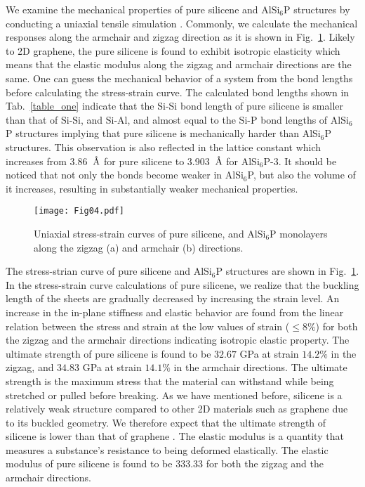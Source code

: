 \documentclass[5p,twocolumn]{elsarticle}
\newcommand{\angstrom}{\text{\normalfont\AA}}
\def\fig#1{Fig.\ \ref{#1}}
\def\tab#1{Tab.\ \ref{#1}}
\begin{document}
We examine the mechanical properties of pure silicene and AlSi$_6$P structures by conducting a uniaxial tensile simulation \cite{MORTAZAVI2017228}. Commonly, we calculate the mechanical responses along the armchair and zigzag direction as it is shown in \fig{fig04}. Likely to 2D graphene, the pure silicene is found to exhibit isotropic elasticity which means that the elastic modulus along the zigzag and armchair directions are the same. One can guess the mechanical behavior of a system from the bond lengths before calculating the stress-strain curve. The calculated bond lengths shown in \tab{table_one} indicate that the Si-Si bond length of pure silicene is smaller than that of Si-Si, and Si-Al, and almost equal to the Si-P bond lengths of AlSi$_6$P structures implying that pure silicene is mechanically harder than AlSi$_6$P structures. This observation is also reflected in the lattice constant which increases from 3.86~$\angstrom$ for pure silicene to 3.903~$\angstrom$ for AlSi$_6$P-3.       
It should be noticed that not only the bonds become weaker in AlSi$_6$P, but also the volume of it increases, resulting in substantially weaker mechanical properties.

\begin{figure}[htb]
	\centering
	\texttt{[image: Fig04.pdf]}
	\caption{Uniaxial stress-strain curves of pure silicene, and AlSi$_6$P monolayers along 
		     the zigzag (a) and armchair (b) directions.}
	\label{fig04}
\end{figure}

The stress-strian curve of pure silicene and AlSi$_6$P structures are shown in \fig{fig04}. 
In the stress-strain curve calculations of pure silicene, we realize that the buckling length of the sheets are gradually decreased by increasing the strain level. An increase in the in-plane stiffness and elastic behavior are found from the linear relation between the stress and strain at the low values of strain ($\le 8 \%$) for both the zigzag and the armchair directions indicating isotropic elastic property. The ultimate strength of pure silicene is found to be $32.67$ GPa at strain $14.2\%$ in the zigzag, and $34.83$ GPa at strain $14.1 \%$ in the armchair directions. The ultimate strength is the maximum stress that the material can withstand while being stretched or pulled before breaking.    
%
As we have mentioned before, silicene is a relatively weak structure
compared to other 2D materials such as graphene due to
its buckled geometry. We therefore expect that the ultimate strength of silicene is lower than that of graphene \cite{ABDULLAH2020126350}. 
%
The elastic modulus is a quantity that measures a substance's resistance to being deformed elastically. The elastic modulus of pure silicene is found to be 333.33 for both the zigzag and the armchair directions.
\end{document}
